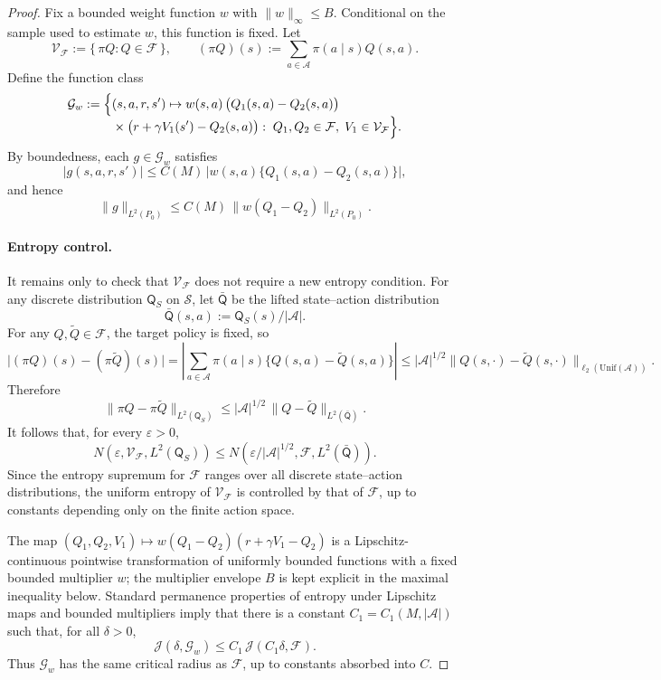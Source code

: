 \documentclass{article}
\theoremstyle{plain}
\theoremstyle{definition}
\theoremstyle{remark}
\begin{document}
\begin{proof}
Fix a bounded weight function \(w\) with \(\|w\|_\infty \le B\). Conditional on
the sample used to estimate $w$, this function is fixed. Let
\[
\mathcal V_{\mathcal F}
:=
\{\,\pi Q : Q\in\mathcal F\,\},
\qquad
(\pi Q)(s):=\sum_{a\in\mathcal A}\pi(a\mid s)Q(s,a).
\]
Define the function class
\begin{align*}
\mathcal{G}_w
:=
\Bigl\{
&(s,a,r,s') \mapsto
w(s,a)\,
\bigl(Q_1(s,a) - Q_2(s,a)\bigr)
\\[-0.4em]
&\times
\bigl(r + \gamma V_1(s') - Q_2(s,a)\bigr)
:\;
Q_1, Q_2 \in \mathcal{F},\;
V_1 \in \mathcal V_{\mathcal F}
\Bigr\}.
\end{align*}
By boundedness, each $g\in\mathcal G_w$ satisfies
\[
|g(s,a,r,s')|
\le
C(M)\,\bigl|w(s,a)\{Q_1(s,a)-Q_2(s,a)\}\bigr|,
\]
and hence
\begin{equation}
\label{eq:norm-g-vs-wdiff-fqe}
\|g\|_{L^2(P_0)}
\le
C(M)\,\|w(Q_1-Q_2)\|_{L^2(P_0)}.
\end{equation}

\paragraph{Entropy control.}
It remains only to check that $\mathcal V_{\mathcal F}$ does not require a
new entropy condition.  For any discrete distribution $\mathsf Q_S$ on $\mathcal S$,
let $\bar{\mathsf Q}$ be the lifted state--action distribution
\[
\bar{\mathsf Q}(s,a):=\mathsf Q_S(s)/|\mathcal A|.
\]
For any $Q,\widetilde Q\in\mathcal F$, the target policy is fixed, so
\[
\big|(\pi Q)(s)-(\pi \widetilde Q)(s)\big|
=
\left|\sum_{a\in\mathcal A}\pi(a\mid s)
\{Q(s,a)-\widetilde Q(s,a)\}\right|
\le
|\mathcal A|^{1/2}
\|Q(s,\cdot)-\widetilde Q(s,\cdot)\|_{\ell_2(\mathrm{Unif}(\mathcal A))}.
\]
Therefore
\[
\|\pi Q-\pi\widetilde Q\|_{L^2(\mathsf Q_S)}
\le
|\mathcal A|^{1/2}\,
\|Q-\widetilde Q\|_{L^2(\bar{\mathsf Q})}.
\]
It follows that, for every $\varepsilon>0$,
\[
N(\varepsilon,\mathcal V_{\mathcal F},L^2(\mathsf Q_S))
\le
N(\varepsilon/|\mathcal A|^{1/2},
  \mathcal F,L^2(\bar{\mathsf Q})).
\]
Since the entropy supremum for $\mathcal F$ ranges over all discrete
state--action distributions, the uniform entropy of $\mathcal V_{\mathcal F}$
is controlled by that of $\mathcal F$, up to constants depending only on the
finite action space.

The map $(Q_1,Q_2,V_1)\mapsto w(Q_1-Q_2)(r+\gamma V_1-Q_2)$ is a
Lipschitz-continuous pointwise transformation of uniformly bounded functions
with a fixed bounded multiplier \(w\); the multiplier envelope \(B\) is kept
explicit in the maximal inequality below.
Standard permanence properties of entropy under Lipschitz maps and bounded
multipliers \citep{van1996weak} imply that there is a constant
$C_1=C_1(M,|\mathcal A|)$ such that, for all $\delta>0$,
\[
\mathcal{J}(\delta,\mathcal G_w)
\le
C_1\,\mathcal{J}(C_1\delta,\mathcal F).
\]
Thus $\mathcal G_w$ has the same critical radius as $\mathcal F$, up to
constants absorbed into $C$.


\end{proof}
\end{document}
